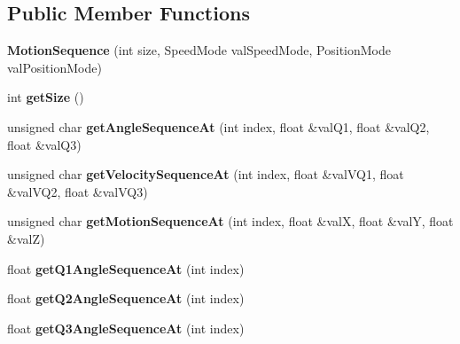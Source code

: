 \subsection*{Public Member Functions}
\begin{DoxyCompactItemize}
\item 
\mbox{\label{class_motion_sequence_aeccbbc93c854052e3b0ba01cebee6633}} 
{\bfseries Motion\+Sequence} (int size, Speed\+Mode val\+Speed\+Mode, Position\+Mode val\+Position\+Mode)
\item 
\mbox{\label{class_motion_sequence_ac0325367b2704b0d2f845f8069ef4b0a}} 
int {\bfseries get\+Size} ()
\item 
\mbox{\label{class_motion_sequence_a68166f9582eae38f2aa137a869443387}} 
unsigned char {\bfseries get\+Angle\+Sequence\+At} (int index, float \&val\+Q1, float \&val\+Q2, float \&val\+Q3)
\item 
\mbox{\label{class_motion_sequence_a455d0103a3df19a1a0ea14cbe9a5facc}} 
unsigned char {\bfseries get\+Velocity\+Sequence\+At} (int index, float \&val\+V\+Q1, float \&val\+V\+Q2, float \&val\+V\+Q3)
\item 
\mbox{\label{class_motion_sequence_a5f6349cb0b1e5916acfd9a9a165519b6}} 
unsigned char {\bfseries get\+Motion\+Sequence\+At} (int index, float \&valX, float \&valY, float \&valZ)
\item 
\mbox{\label{class_motion_sequence_a8865eb9528ee86c93d9f2d2be58dd55b}} 
float {\bfseries get\+Q1\+Angle\+Sequence\+At} (int index)
\item 
\mbox{\label{class_motion_sequence_a9be53be839ed033b0d551dcf74c6a8a2}} 
float {\bfseries get\+Q2\+Angle\+Sequence\+At} (int index)
\item 
\mbox{\label{class_motion_sequence_aa7bb8a17554cda64c2e5dbd6af1d25cb}} 
float {\bfseries get\+Q3\+Angle\+Sequence\+At} (int index)
\item 
\mbox{\label{class_motion_sequence_a4a03996f66ded7ea006a9de3af99fdad}} 

\end{DoxyCompactItemize}
